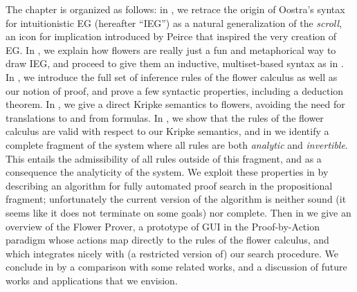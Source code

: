 The chapter is organized as follows: in , we retrace the origin of
Oostra's syntax for intuitionistic EG (hereafter ``IEG'') as a natural
generalization of the \emph{scroll}, an icon for implication introduced by
Peirce that inspired the very creation of EG. In , we explain
how flowers are really just a fun and metaphorical way to draw IEG, and proceed
to give them an inductive, multiset-based syntax as in . In
, we introduce the full set of inference rules of the flower
calculus as well as our notion of proof, and prove a few syntactic properties,
including a deduction theorem. In , we give a direct Kripke
semantics to flowers, avoiding the need for translations to and from formulas.
In , we show that the rules of the flower calculus are valid
with respect to our Kripke semantics, and in  we identify a
complete fragment of the system where all rules are both \emph{analytic} and
\emph{invertible}. This entails the admissibility of all rules outside of this
fragment, and as a consequence the analyticity of the system. We exploit these
properties in  by describing an algorithm for fully
automated proof search in the propositional fragment; unfortunately the current
version of the algorithm is neither sound (it seems like it does not terminate
on some goals) nor complete. Then in  we give an overview
of the Flower Prover, a prototype of GUI in the Proof-by-Action paradigm whose
actions map directly to the rules of the flower calculus, and which integrates
nicely with (a restricted version of) our search procedure. We conclude in
 by a comparison with some related works, and a discussion of
future works and applications that we envision.




